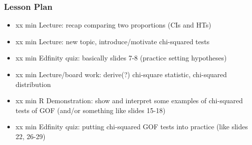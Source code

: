 \begin{frame}
    \frametitle{Lesson Plan}
    \begin{itemize}
        \item xx min Lecture: recap comparing two proportions (CIs and HTs)
        \item xx min Lecture: new topic, introduce/motivate chi-squared tests
        \item xx min Edfinity quiz: basically slides 7-8 (practice setting hypotheses)
        \item xx min Lecture/board work: derive(?) chi-square statistic, chi-squared distribution
        \item xx min R Demonstration: show and interpret some examples of chi-squared tests of GOF (and/or something like slides 15-18)
        \item xx min Edfinity quiz: putting chi-squared GOF tests into practice (like slides 22, 26-29)
    \end{itemize}
\end{frame}
            
    


